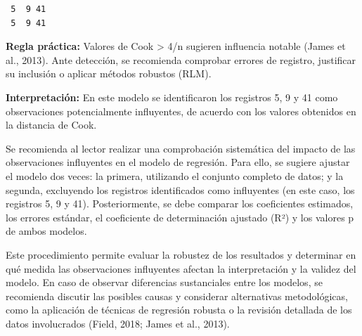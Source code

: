 \documentclass[
  spanish,
  a4paper,
  DIV=11,
  numbers=noendperiod,
  onepage,
  openany]{scrreprt}
\begin{document}
\begin{verbatim}
 5  9 41 
 5  9 41 
\end{verbatim}

\textbf{Regla práctica:} Valores de Cook \textgreater{} 4/n sugieren
influencia notable (James et al., 2013). Ante detección, se recomienda
comprobar errores de registro, justificar su inclusión o aplicar métodos
robustos (RLM).

\textbf{Interpretación:} En este modelo se identificaron los registros
5, 9 y 41 como observaciones potencialmente influyentes, de acuerdo con
los valores obtenidos en la distancia de Cook.

Se recomienda al lector realizar una comprobación sistemática del
impacto de las observaciones influyentes en el modelo de regresión. Para
ello, se sugiere ajustar el modelo dos veces: la primera, utilizando el
conjunto completo de datos; y la segunda, excluyendo los registros
identificados como influyentes (en este caso, los registros 5, 9 y 41).
Posteriormente, se debe comparar los coeficientes estimados, los errores
estándar, el coeficiente de determinación ajustado (R²) y los valores p
de ambos modelos.

Este procedimiento permite evaluar la robustez de los resultados y
determinar en qué medida las observaciones influyentes afectan la
interpretación y la validez del modelo. En caso de observar diferencias
sustanciales entre los modelos, se recomienda discutir las posibles
causas y considerar alternativas metodológicas, como la aplicación de
técnicas de regresión robusta o la revisión detallada de los datos
involucrados (Field, 2018; James et al., 2013).
\end{document}
